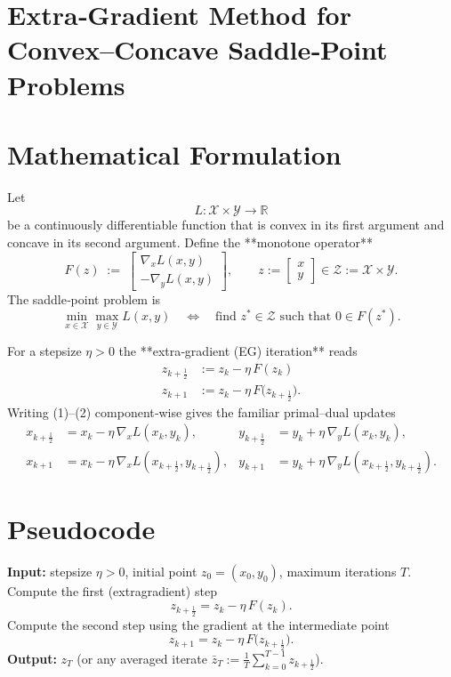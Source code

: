 \documentclass{article}
\begin{document}
\section*{Extra‑Gradient Method for Convex–Concave Saddle‑Point Problems}

\section*{Mathematical Formulation}
Let 
\[
L:\mathcal X\times\mathcal Y\rightarrow\mathbb R
\]
be a continuously differentiable function that is convex in its first argument
and concave in its second argument.  Define the **monotone operator**
\[
F(z)\;:=\;
\begin{bmatrix}
\nabla_{x} L(x,y)\\[2mm]
-\nabla_{y} L(x,y)
\end{bmatrix},
\qquad
z:=\begin{bmatrix}x\\y\end{bmatrix}\in\mathcal Z:=\mathcal X\times\mathcal Y .
\]
The saddle‑point problem is
\[
\min_{x\in\mathcal X}\max_{y\in\mathcal Y} L(x,y)
\quad\Longleftrightarrow\quad
\text{find }z^{*}\in\mathcal Z\text{ such that }0\in F(z^{*}).
\]

For a stepsize \(\eta>0\) the **extra‑gradient (EG) iteration** reads
\[
\boxed{
\begin{aligned}
z_{k+\frac12}&:=z_{k}-\eta\,F(z_{k}) \tag{1}\\[1mm]
z_{k+1}&:=z_{k}-\eta\,F\!\bigl(z_{k+\frac12}\bigr). \tag{2}
\end{aligned}}
\]
Writing (1)–(2) component‑wise gives the familiar primal–dual updates
\[
\begin{aligned}
x_{k+\frac12}&=x_{k}-\eta\,\nabla_{x}L(x_{k},y_{k}), &
y_{k+\frac12}&=y_{k}+ \eta\,\nabla_{y}L(x_{k},y_{k}),\\
x_{k+1}&=x_{k}-\eta\,\nabla_{x}L(x_{k+\frac12},y_{k+\frac12}), &
y_{k+1}&=y_{k}+ \eta\,\nabla_{y}L(x_{k+\frac12},y_{k+\frac12}).
\end{aligned}
\]

\section*{Pseudocode}
\begin{algorithm}[H]
\caption{Extra‑Gradient Method (EG)}
\begin{algorithmic}[1]
\STATE \textbf{Input:} stepsize \(\eta>0\), initial point \(z_{0}=(x_{0},y_{0})\), maximum iterations \(T\).
    \STATE Compute the first (extragradient) step
    \[
    z_{k+\frac12}=z_{k}-\eta\,F(z_{k}) .
    \]
    \STATE Compute the second step using the gradient at the intermediate point
    \[
    z_{k+1}=z_{k}-\eta\,F\!\bigl(z_{k+\frac12}\bigr).
    \]
\ENDFOR
\STATE \textbf{Output:} \(z_{T}\) (or any averaged iterate \(\bar z_{T}:=\frac1T\sum_{k=0}^{T-1}z_{k+\frac12}\)).
\end{algorithmic}
\end{algorithm}
\end{document}
